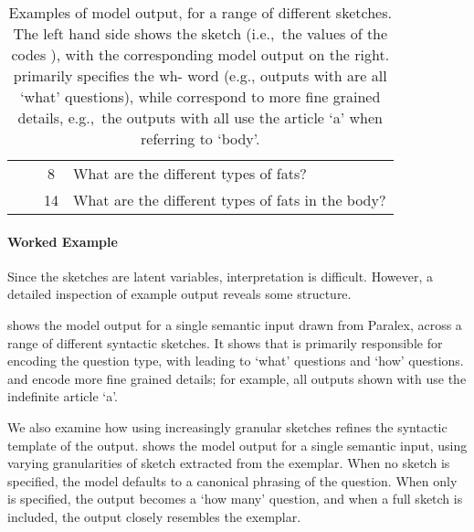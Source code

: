 \documentclass[11pt]{article}
\begin{document}
\begin{table}[t]
\begin{tabular}{@{~}c@{~}c@{~}c@{~}|@{~}p{6cm}@{}}
 &  & 8  &  What are the different types of fats?  \\

&  & 14  &  What are the different types of fats in the body?  \\




\hline \hline
    \end{tabular}
\caption{Examples of model output, for a range of different sketches. The left hand side shows the sketch (i.e.,~the values of the codes ), with the corresponding model output on the right.  primarily specifies the wh- word (e.g., outputs with  are all `what' questions), while  correspond to more fine grained details, e.g.,~the outputs with  all use the article `a' when referring to `body'.}
\label{tab:workedex}
\end{table}


\paragraph{Worked Example}

Since the sketches  are latent variables, interpretation is difficult. However, a detailed inspection of example output reveals some structure.

 shows the model output for a single semantic input drawn from Paralex, across a range of different syntactic sketches. It shows that  is primarily responsible for encoding the question type, with  leading to `what' questions and  `how' questions.  and  encode more fine grained details; for example, all outputs shown with  use the indefinite article `a'.

We also examine how using increasingly granular sketches refines the syntactic template of the output.  shows the model output for a single semantic input, using varying granularities of sketch extracted from the exemplar. When no sketch is specified, the model defaults to a canonical phrasing of the question. When only  is specified, the output becomes a `how many' question, and when a full sketch is included, the output closely resembles the exemplar.
\end{document}

